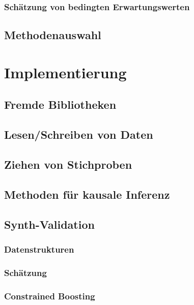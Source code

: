 \documentclass[12pt,a4paper,twoside]{scrartcl}
\numberwithin{equation}{section}
\begin{document}
  		\subsubsection{Schätzung von bedingten Erwartungswerten}\label{subsubsec:schätzungBedingtenErwartungswerten}
  	\subsection{Methodenauswahl}\label{subsec:methodenauswahl}
\clearpage

\section{Implementierung}\label{sec:implementierung}
	\subsection{Fremde Bibliotheken}\label{subsec:fremdeBibliotheken}
  	\subsection{Lesen/Schreiben von Daten}\label{subsec:lesenSchreibenDaten}
  	\subsection{Ziehen von Stichproben}\label{subsec:ziehenStichproben}
  	\subsection{Methoden für kausale Inferenz}\label{subsec:methodenKausaleInferenz}
  	\subsection{Synth-Validation}\label{subsec:synthValidation}
  		\subsubsection{Datenstrukturen}\label{subsubsec:datenstrukturen}
  		\subsubsection{Schätzung}\label{subsubsec:schätung}
  		\subsubsection{Constrained Boosting}\label{subsubsec:constrainedBoosting}
\end{document}
